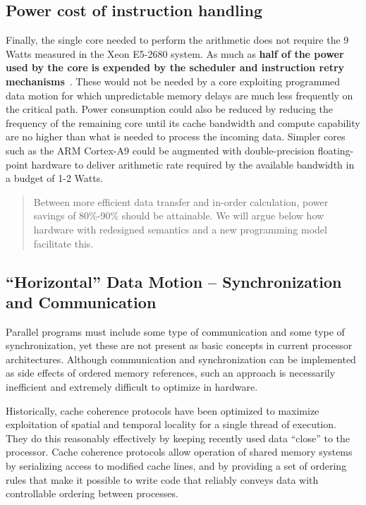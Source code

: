 \subsection{Power cost of instruction handling}
\label{sec:instruction-cost}

Finally, the single core needed to perform the arithmetic does not
require the 9 Watts measured in the Xeon E5-2680 system.  As much as
\textbf{half of the power used by the core is expended by the scheduler and
instruction retry mechanisms}~\cite{Chen:power-debugging}.  These would
not be needed by a core exploiting programmed data motion for which
unpredictable memory delays are much less frequently on the critical
path.  Power consumption could also be reduced by reducing the
frequency of the remaining core until its cache bandwidth and compute
capability are no higher than what is needed to process the incoming
data.  Simpler cores such as the ARM Cortex-A9 could be augmented with
double-precision floating-point hardware to deliver arithmetic rate
required by the available bandwidth in a budget of 1-2 Watts.


\begin{quotation}
  Between more efficient data transfer and in-order calculation, power
  savings of 80\%-90\% should be attainable. We will argue below how hardware
  with redesigned semantics and a new programming model facilitate this.
\end{quotation}

\subsection{``Horizontal'' Data Motion -- Synchronization and Communication}
\label{sec:morewrong}

Parallel programs must include some type of communication and some type of 
synchronization, yet these are not present as basic concepts in current processor
architectures.  Although communication and synchronization can be implemented
as side effects of ordered memory references, such an approach is necessarily
inefficient and extremely difficult to optimize in hardware.

 Historically, cache coherence protocols have
been optimized to maximize exploitation of spatial and temporal
locality for a single thread of execution.  They do this reasonably
effectively by keeping recently used data ``close'' to the processor.
Cache coherence protocols allow operation of shared memory systems by
serializing access to modified cache lines, and by providing a set of
ordering rules that make it possible to write code that reliably
conveys data with controllable ordering between processes.

